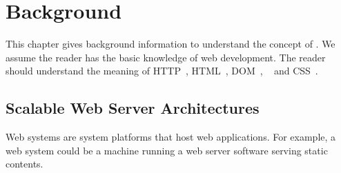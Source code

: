 \chapter{Background}

This chapter gives background information to understand the concept of \cbtwo.
We assume the reader has the basic knowledge of web development.
The reader should understand the meaning of HTTP~\cite{rfc7231}, HTML~\cite{hickson2012html}, 
DOM~\cite{2000Document}, \js~\cite{ecmascript2011ecmascript} and CSS~\cite{css21}.

\webscaleoutfig{}

\section{Scalable Web Server Architectures}
\label{sec:websys}

Web systems are system platforms that host web applications.
For example, a web system could be a machine running a web
server software serving static contents.

